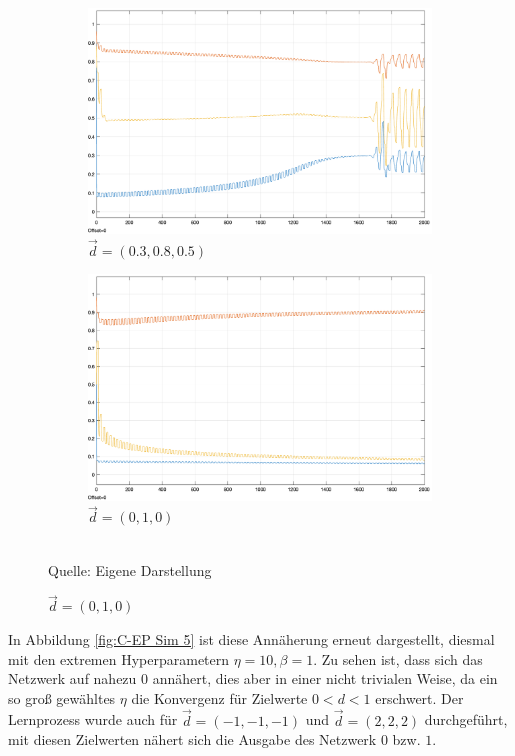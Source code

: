 \begin{figure}[h]
  \label{fig:C-EP Sim 1,2}
  \caption{Simulationen des \ac{c-ep} mit \(\beta=1,\eta=0.5\). Dargestellt ist die Ausgabe des Netzwerks}
  \centering
  \begin{subfigure}[b]{0.5\textwidth}
    \includegraphics[width=\textwidth]{abbildungen/c_ep_sim_1_ausgabe.png}
    \caption{\(\vec{d}=(0.3,0.8,0.5)\)}
  \end{subfigure}%
  \hfill
  \begin{subfigure}[b]{0.5\textwidth}
    \includegraphics[width=\textwidth]{abbildungen/c_ep_sim_2_ausgabe.png}
    \caption{\(\vec{d}=(0,1,0)\)}
  \end{subfigure}
  \\
  Quelle: Eigene Darstellung
\end{figure}

In Abbildung \ref{fig:C-EP Sim 5} ist diese Annäherung erneut dargestellt, diesmal mit den extremen Hyperparametern \(\eta=10,\beta=1\). Zu sehen ist, dass sich das Netzwerk auf nahezu \(0\) annähert, dies aber in einer nicht trivialen Weise, da ein so groß gewähltes \(\eta\) die Konvergenz für Zielwerte \(0<d<1\) erschwert. Der Lernprozess wurde auch für \(\vec{d}=(-1,-1,-1)\) und \(\vec{d}=(2,2,2)\) durchgeführt, mit diesen Zielwerten nähert sich die Ausgabe des Netzwerk \(0\) bzw. \(1\).

